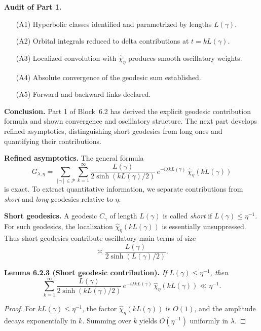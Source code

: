 \medskip

\noindent\textbf{Audit of Part 1.}
\begin{itemize}
  \item[(A1)] Hyperbolic classes identified and parametrized by lengths $L(\gamma)$.
  \item[(A2)] Orbital integrals reduced to delta contributions at $t=kL(\gamma)$.
  \item[(A3)] Localized convolution with $\widehat{\chi}_\eta$ produces smooth oscillatory weights.
  \item[(A4)] Absolute convergence of the geodesic sum established.
  \item[(A5)] Forward and backward links declared.
\end{itemize}

\medskip

\noindent\textbf{Conclusion.}
Part 1 of Block~6.2 has derived the explicit geodesic contribution formula
and shown convergence and oscillatory structure.
The next part develops refined asymptotics,
distinguishing short geodesics from long ones
and quantifying their contributions.



\noindent\textbf{Refined asymptotics.}
The general formula
\[
  G_{\lambda,\eta} =
  \sum_{[\gamma]\in \mathcal{P}} \sum_{k=1}^\infty
  \frac{L(\gamma)}{2\sinh(kL(\gamma)/2)}\,
  e^{-i\lambda kL(\gamma)}\, \widehat{\chi}_\eta(kL(\gamma))
\]
is exact.
To extract quantitative information, we separate contributions from
\emph{short} and \emph{long} geodesics relative to $\eta$.

\medskip

\noindent\textbf{Short geodesics.}
A geodesic $C_\gamma$ of length $L(\gamma)$ is called \emph{short} if $L(\gamma)\le \eta^{-1}$.
For such geodesics, the localization $\widehat{\chi}_\eta(kL(\gamma))$
is essentially unsuppressed.
Thus short geodesics contribute oscillatory main terms of size
\[
  \asymp \frac{L(\gamma)}{2\sinh(L(\gamma)/2)}.
\]

\noindent\textbf{Lemma 6.2.3 (Short geodesic contribution).}
\emph{If $L(\gamma)\le \eta^{-1}$, then}
\[
  \sum_{k=1}^\infty \frac{L(\gamma)}{2\sinh(kL(\gamma)/2)}\,
  e^{-i\lambda kL(\gamma)}\, \widehat{\chi}_\eta(kL(\gamma))
  \ll \eta^{-1}.
\]
\begin{proof}
For $kL(\gamma)\le \eta^{-1}$,
the factor $\widehat{\chi}_\eta(kL(\gamma))$ is $O(1)$,
and the amplitude decays exponentially in $k$.
Summing over $k$ yields $O(\eta^{-1})$ uniformly in $\lambda$.
\end{proof}

